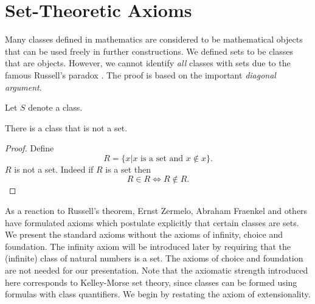 \documentclass{article}
\begin{document}
\section{Set-Theoretic Axioms}

Many classes defined in mathematics are considered to be
mathematical objects that can be used freely in further constructions.
We defined sets to be classes that are objects. However, we cannot
identify {\em all} classes with sets due to the famous
Russell's paradox \cite{Russell1903}.
The proof is based on the important {\em diagonal argument}.

\begin{forthel}
Let $S$ denote a class.

\begin{theorem}[title=Russell]
There is a class that is not a set.
\end{theorem}
\begin{proof}
Define $$R = \{x |\text{$x$ is a set and $x \notin x$}\}.$$
$R$ is not a set.
Indeed if $R$ is a set then $$R \in R \iff R \notin R.$$
\end{proof}
\end{forthel}

As a reaction to Russell's theorem, Ernst Zermelo, Abraham
Fraenkel and others have formulated axioms which
postulate explicitly that certain classes are sets. We
present the standard axioms without
the axioms of infinity, choice and foundation. The infinity
axiom will be introduced later by requiring that the
(infinite) class
of natural numbers is a set. The axioms of choice
and foundation are not needed for our presentation.
Note that the axiomatic strength introduced here corresponds
to Kelley-Morse set theory, since classes can be formed using
formulas with class quantifiers.
We begin by restating
the axiom of extensionality.
\end{document}
